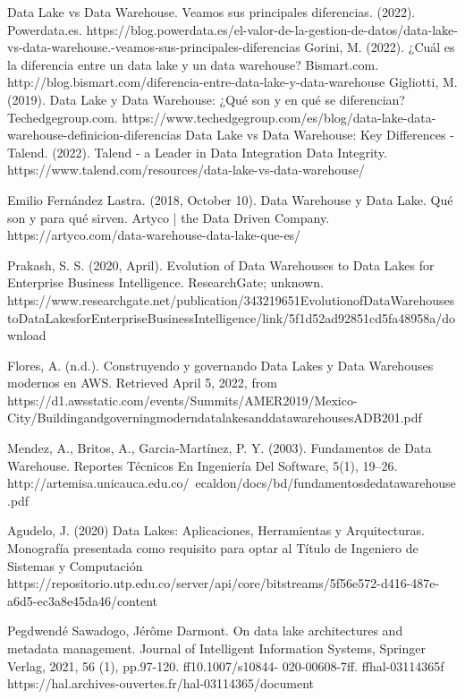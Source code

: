 \documentclass[twoside,twocolumn]{article}
\begin{document}
\begin{thebibliography}{}

    Data Lake vs Data Warehouse. Veamos sus principales diferencias. (2022). Powerdata.es. https://blog.powerdata.es/el-valor-de-la-gestion-de-datos/data-lake-vs-data-warehouse.-veamos-sus-principales-diferencias
   Gorini, M. (2022). ¿Cuál es la diferencia entre un data lake y un data warehouse? Bismart.com. http://blog.bismart.com/diferencia-entre-data-lake-y-data-warehouse
   Gigliotti, M. (2019). Data Lake y Data Warehouse: ¿Qué son y en qué se diferencian? Techedgegroup.com. https://www.techedgegroup.com/es/blog/data-lake-data-warehouse-definicion-diferencias
   Data Lake vs Data Warehouse: Key Differences - Talend. (2022). Talend - a Leader in Data Integration Data Integrity. https://www.talend.com/resources/data-lake-vs-data-warehouse/
  
    Emilio Fernández Lastra. (2018, October 10). Data Warehouse y Data Lake. Qué son y para qué sirven. Artyco | the Data Driven Company. https://artyco.com/data-warehouse-data-lake-que-es/
    
   Prakash, S. S. (2020, April). Evolution of Data Warehouses to Data Lakes for Enterprise Business Intelligence. ResearchGate; unknown. https://www.researchgate.net/publication/343219651EvolutionofDataWarehousestoDataLakesforEnterpriseBusinessIntelligence/link/5f1d52ad92851cd5fa48958a/download
   
  Flores, A. (n.d.). Construyendo y governando Data Lakes y Data Warehouses modernos en AWS. Retrieved April 5, 2022, from https://d1.awsstatic.com/events/Summits/AMER2019/Mexico-City/BuildingandgoverningmoderndatalakesanddatawarehousesADB201.pdf
   
   Mendez, A., Britos, A.,  Garcia-Martínez, P. Y. (2003). Fundamentos de Data Warehouse. Reportes Técnicos En Ingeniería Del Software, 5(1), 19–26. http://artemisa.unicauca.edu.co/~ecaldon/docs/bd/fundamentosdedatawarehouse.pdf
    
    Agudelo, J. (2020) Data Lakes: Aplicaciones, Herramientas y Arquitecturas. Monografía presentada como requisito para optar al Título de Ingeniero de Sistemas y Computación https://repositorio.utp.edu.co/server/api/core/bitstreams/5f56e572-d416-487e-a6d5-ec3a8e45da46/content
 
	Pegdwendé Sawadogo, Jérôme Darmont. On data lake architectures and metadata management. Journal of Intelligent Information Systems, Springer Verlag, 2021, 56 (1), pp.97-120. ff10.1007/s10844- 020-00608-7ff. ffhal-03114365f https://hal.archives-ouvertes.fr/hal-03114365/document


 
    \end{thebibliography}


\end{document}

